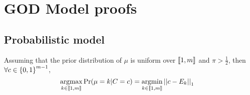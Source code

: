 \section{GOD Model proofs}

\subsection{Probabilistic model}

\begin{thm}
    \label{thm:projection_appendix}
    Assuming that the prior distribution of $\mu$ is uniform over $\left\llbracket1, m\right\rrbracket$ and $\pi > \frac{1}{2}$, then \(\forall c \in \left\{ 0, 1 \right\}^{m-1}\),
    \[\operatorname*{argmax}_{k \in \left\llbracket1, m\right\rrbracket} \Pr(\mu = k | C = c) = \operatorname*{argmin}_{k \in \left\llbracket1, m\right\rrbracket} \left|\left|c - E_k\right|\right|_1\]
\end{thm}

